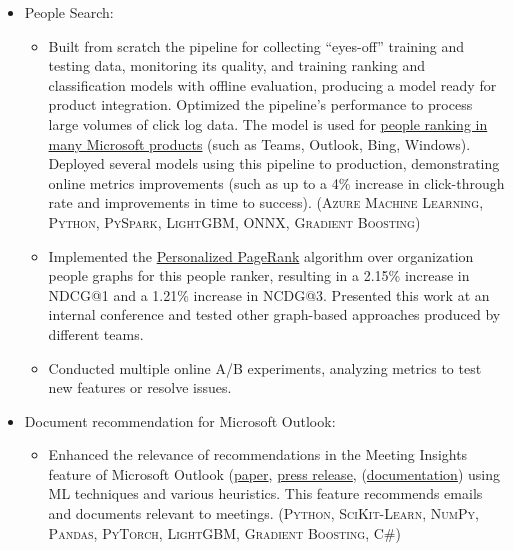 \documentclass{article}
\begin{document}
\begin{itemize}

\item People Search:

  \begin{itemize}

  \item Built from scratch the pipeline for collecting ``eyes-off'' training and testing data, monitoring its quality, and training ranking and classification models with offline evaluation, producing a model ready for product integration. Optimized the pipeline's performance to process large volumes of click log data. The model is used for \href{https://www.youtube.com/watch?v=a6HO4ekmmjU}{people ranking in many Microsoft products} (such as Teams, Outlook, Bing, Windows). Deployed several models using this pipeline to production, demonstrating online metrics improvements (such as up to a 4\% increase in click-through rate and improvements in time to success). (\textsc{Azure Machine Learning}, \textsc{Python}, \textsc{PySpark}, \textsc{LightGBM}, \textsc{ONNX}, \textsc{Gradient Boosting})

  \item Implemented the \href{https://www.cs.cornell.edu/~bindel/blurbs/edgeppr.html}{Personalized PageRank} algorithm over organization people graphs for this people ranker, resulting in a 2.15\% increase in NDCG@1 and a 1.21\% increase in NCDG@3. Presented this work at an internal conference and tested other graph-based approaches produced by different teams.

  \item Conducted multiple online A/B experiments, analyzing metrics to test new features or resolve issues.

  \end{itemize}

\item Document recommendation for Microsoft Outlook:

  \begin{itemize}

  \item Enhanced the relevance of recommendations in the Meeting Insights feature of Microsoft Outlook (\href{https://www.microsoft.com/en-us/research/publication/calendar-aware-proactive-email-recommendation/}{paper}, \href{https://www.microsoft.com/en-us/research/blog/the-story-of-an-office-ai-feature-how-ai-can-promote-efficient-meeting-preparation/}{press release}, (\href{https://support.microsoft.com/en-gb/office/use-intelligent-technology-in-outlook-on-the-web-and-outlook-com-24b30683-8340-4b69-b8ac-4193ec528a70}{documentation}) using ML techniques and various heuristics. This feature recommends emails and documents relevant to meetings. (\textsc{Python}, \textsc{SciKit-Learn}, \textsc{NumPy}, \textsc{Pandas}, \textsc{PyTorch}, \textsc{LightGBM}, \textsc{Gradient Boosting}, \textsc{C\#})


\end{itemize}
\end{itemize}
\end{document}
